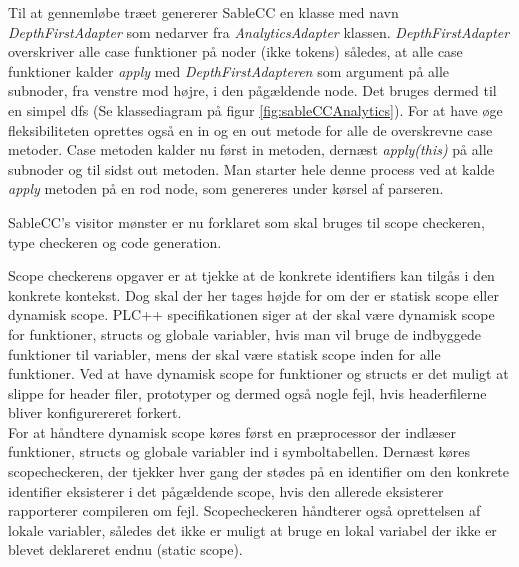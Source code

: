  Til at gennemløbe træet genererer SableCC en klasse med navn \textit{DepthFirstAdapter} som nedarver fra \textit{AnalyticsAdapter} klassen. \textit{DepthFirstAdapter} overskriver alle case funktioner på noder (ikke tokens) således, at alle case funktioner kalder \textit{apply} med \textit{DepthFirstAdapteren} som argument på alle subnoder, fra venstre mod højre, i den pågældende node. Det bruges dermed til en simpel \gls{dfs} (Se klassediagram på figur \ref{fig:sableCCAnalytics}). For at have øge fleksibiliteten oprettes også en in og en out metode for alle de overskrevne case metoder. Case metoden kalder nu først in metoden, dernæst \textit{apply(this)} på alle subnoder og til sidst out metoden. Man starter hele denne process ved at kalde \textit{apply} metoden på en rod node, som genereres under kørsel af parseren.

\bigskip



\noindent SableCC's visitor mønster er nu forklaret som skal bruges til scope checkeren, type checkeren og code generation.

Scope checkerens opgaver er at tjekke at de konkrete identifiers kan tilgås i den konkrete kontekst. Dog skal der her tages højde for om der er statisk scope eller dynamisk scope. PLC++ specifikationen siger at der skal være dynamisk scope for funktioner, structs og globale variabler, hvis man vil bruge de indbyggede funktioner til variabler, mens der skal være statisk scope inden for alle funktioner. Ved at have dynamisk scope for funktioner og structs er det muligt at slippe for header filer, prototyper og dermed også nogle fejl, hvis headerfilerne bliver konfigurereret forkert.\\

\noindent For at håndtere dynamisk scope køres først en præprocessor der indlæser funktioner, structs og globale variabler ind i symboltabellen. Dernæst køres scopecheckeren, der tjekker hver gang der stødes på en identifier om den konkrete identifier eksisterer i det pågældende scope, hvis den allerede eksisterer rapporterer compileren om fejl. Scopecheckeren håndterer også oprettelsen af lokale variabler, således det ikke er muligt at bruge en lokal variabel der ikke er blevet deklareret endnu (static scope).\\

